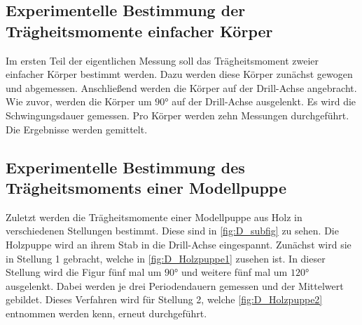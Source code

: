 \subsection{Experimentelle Bestimmung der Trägheitsmomente einfacher Körper}
\label{subsec:D_Körper}
Im ersten Teil der eigentlichen Messung soll das Trägheitsmoment zweier einfacher Körper bestimmt werden. Dazu werden diese Körper zunächst gewogen und abgemessen. Anschließend
werden die Körper auf der Drill-Achse angebracht. Wie zuvor, werden
die Körper um $90\unit{\degree}$ auf der Drill-Achse ausgelenkt. Es wird die Schwingungsdauer gemessen. Pro Körper werden zehn Messungen durchgeführt. Die Ergebnisse werden gemittelt.
\subsection{Experimentelle Bestimmung des Trägheitsmoments einer Modellpuppe}
\label{subsec:D_Figur}
Zuletzt werden die Trägheitsmomente einer Modellpuppe aus Holz in verschiedenen Stellungen bestimmt. Diese sind in \autoref{fig:D_subfig} zu sehen.
Die Holzpuppe wird an ihrem Stab in die Drill-Achse eingespannt. Zunächst wird sie in Stellung 1 gebracht, welche in \autoref{fig:D_Holzpuppe1} zusehen ist. In dieser Stellung wird die Figur fünf 
mal um $90\unit{\degree}$ und weitere fünf mal um $120\unit{\degree}$ ausgelenkt. Dabei werden je drei Periodendauern gemessen und der Mittelwert gebildet. Dieses Verfahren wird für 
Stellung 2, welche \autoref{fig:D_Holzpuppe2} entnommen werden kenn, erneut durchgeführt. 

